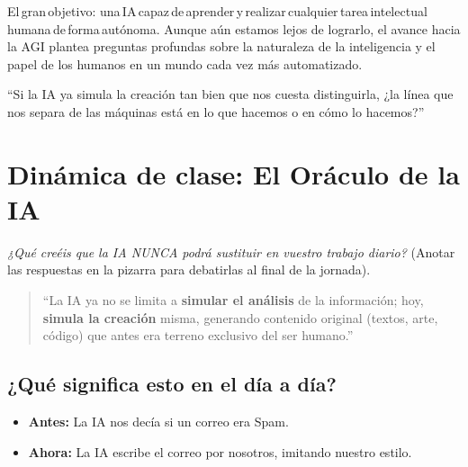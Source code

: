 \documentclass[
  spanish,
  letterpaper,
  DIV=11,
  numbers=noendperiod,
  oneside]{scrreprt}
\providecommand{\tightlist}{%
  \setlength{\itemsep}{0pt}\setlength{\parskip}{0pt}}
\begin{document}
El\,gran\,objetivo:
una\,IA\,capaz\,de\,aprender\,y\,realizar\,cualquier\,tarea\,intelectual\,humana\,de\,forma\,autónoma.
Aunque aún estamos lejos de lograrlo, el avance hacia la AGI plantea
preguntas profundas sobre la naturaleza de la inteligencia y el papel de
los humanos en un mundo cada vez más automatizado.

\begin{tcolorbox}[enhanced jigsaw, arc=.35mm, bottomrule=.15mm, bottomtitle=1mm, breakable, colback=white, colbacktitle=quarto-callout-important-color!10!white, colframe=quarto-callout-important-color-frame, coltitle=black, left=2mm, leftrule=.75mm, opacityback=0, opacitybacktitle=0.6, rightrule=.15mm, title=\textcolor{quarto-callout-important-color}{\faExclamation}\hspace{0.5em}{🧠 Gran Debate: ¿La IA piensa o solo calcula?}, titlerule=0mm, toprule=.15mm, toptitle=1mm]

``Si la IA ya simula la creación tan bien que nos cuesta distinguirla,
¿la línea que nos separa de las máquinas está en lo que hacemos o en
cómo lo hacemos?''

\end{tcolorbox}

\section{Dinámica de clase: El Oráculo de la
IA}\label{dinuxe1mica-de-clase-el-oruxe1culo-de-la-ia}

\emph{¿Qué creéis que la IA NUNCA podrá sustituir en vuestro trabajo
diario?} (Anotar las respuestas en la pizarra para debatirlas al final
de la jornada).

\begin{quote}
``La IA ya no se limita a \textbf{simular el análisis} de la
información; hoy, \textbf{simula la creación} misma, generando contenido
original (textos, arte, código) que antes era terreno exclusivo del ser
humano.''
\end{quote}

\subsection{¿Qué significa esto en el día a
día?}\label{quuxe9-significa-esto-en-el-duxeda-a-duxeda}

\begin{itemize}
\tightlist
\item
  \textbf{Antes:} La IA nos decía si un correo era Spam.
\item
  \textbf{Ahora:} La IA escribe el correo por nosotros, imitando nuestro
  estilo.
\end{itemize}
\end{document}
